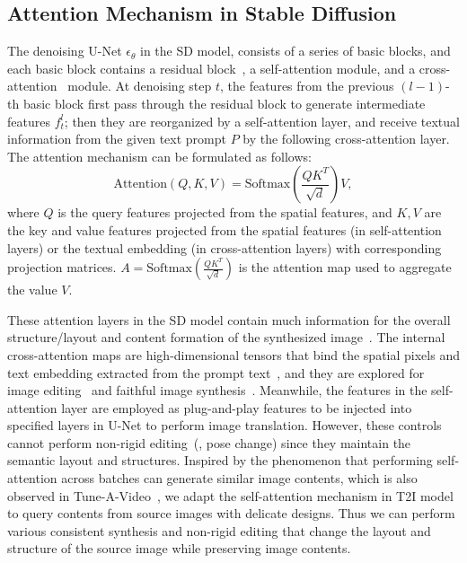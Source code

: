 \documentclass[10pt,twocolumn,letterpaper]{article}
\begin{document}
\subsection{Attention Mechanism in Stable Diffusion}
The denoising U-Net $\epsilon_\theta$ in the SD model, consists of a series of basic blocks, and each basic block contains a residual block~\cite{he2016deep}, a self-attention module, and a cross-attention~\cite{vaswani2017attention} module. At denoising step $t$, the features from the previous $(l{-}1)$-th basic block first pass through the residual block to generate intermediate features $f^l_t$; then they are reorganized by a self-attention layer, and receive textual information from the given text prompt $P$ by the following cross-attention layer. The attention mechanism can be formulated as follows:
\begin{equation}
    \label{eq:attention}
    \text{Attention}(Q, K, V) = \text{Softmax}(\frac{QK^T}{\sqrt{d}})V,
\end{equation}
where $Q$ is the query features projected from the spatial features, and $K, V$ are the key and value features projected from the spatial features (in self-attention layers) or the textual embedding (in cross-attention layers) with corresponding projection matrices. $A = \text{Softmax}(\frac{QK^T}{\sqrt{d}})$ is the attention map used to aggregate the value $V$. 

These attention layers in the SD model contain much information for the overall structure/layout and content formation of the synthesized image~\cite{hertz2022prompt, tumanyan2022plug}. The internal cross-attention maps are high-dimensional tensors that bind the spatial pixels and text embedding extracted from the prompt text~\cite{hertz2022prompt}, and they are explored for image editing~\cite{hertz2022prompt} and faithful image synthesis~\cite{chefer2023attend}. Meanwhile, the features in the self-attention layer are employed as plug-and-play features to be injected into specified layers in U-Net to perform image translation. However, these controls cannot perform non-rigid editing~(\eg, pose change) since they maintain the semantic layout and structures. 
Inspired by the phenomenon that performing self-attention across batches can generate similar image contents, which is also observed in Tune-A-Video~\cite{wu2022tune}, we adapt the self-attention mechanism in T2I model to query contents from source images with delicate designs. Thus we can perform various consistent synthesis and non-rigid editing that change the layout and structure of the source image while preserving image contents. 
\end{document}
